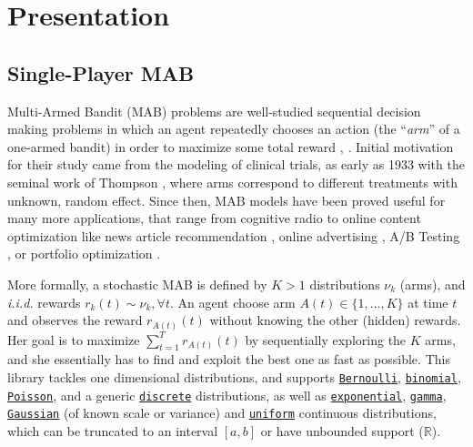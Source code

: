 \documentclass[a4paper,10pt,]{article}
\begin{document}

\section{Presentation}\label{presentation}

\subsection{Single-Player MAB}\label{single-player-mab}

Multi-Armed Bandit (MAB) problems are well-studied sequential decision
making problems in which an agent repeatedly chooses an action (the
``\emph{arm}'' of a one-armed bandit) in order to maximize some total
reward \citep{Robbins52}, \citep{LaiRobbins85}. Initial motivation for
their study came from the modeling of clinical trials, as early as 1933
with the seminal work of Thompson \citep{Thompson33}, where arms
correspond to different treatments with unknown, random effect. Since
then, MAB models have been proved useful for many more applications,
that range from cognitive radio \citep{Jouini09} to online content
optimization like news article recommendation \citep{Li10}, online
advertising \citep{LiChapelle11}, A/B Testing \citep{Kaufmann14,Jamieson17ABTest}, or portfolio optimization \citep{Sani12}.


More formally, a stochastic MAB is defined by $K>1$ distributions $\nu_k$ (arms),
and \emph{i.i.d.} rewards $r_k(t) \sim \nu_k, \forall t$.
An agent choose arm $A(t)\in\{1,\dots,K\}$ at time $t$ and
observes the reward $r_{A(t)}(t)$ without knowing the other (hidden) rewards.
Her goal is to maximize $\sum_{t=1}^T r_{A(t)}(t)$ by sequentially exploring the $K$ arms,
and she essentially has to find and exploit the best one as fast as possible.
This library tackles one dimensional distributions,
and supports \href{https://SMPyBandits.GitHub.io/docs/Arms.Bernoulli.html}{\texttt{Bernoulli}}, \href{https://SMPyBandits.GitHub.io/docs/Arms.Binomial.html}{\texttt{binomial}}, \href{https://SMPyBandits.GitHub.io/docs/Arms.Poisson.html}{\texttt{Poisson}}, and a generic \href{https://SMPyBandits.GitHub.io/docs/Arms.DiscreteArm.html}{\texttt{discrete}} distributions,
as well as \href{https://SMPyBandits.GitHub.io/docs/Arms.Exponential.html}{\texttt{exponential}}, \href{https://SMPyBandits.GitHub.io/docs/Arms.Gamma.html}{\texttt{gamma}}, \href{https://SMPyBandits.GitHub.io/docs/Arms.Gaussian.html}{\texttt{Gaussian}} (of known scale or variance) and \href{https://SMPyBandits.GitHub.io/docs/Arms.Uniform.html}{\texttt{uniform}} continuous distributions,
which can be truncated to an interval $[a,b]$ or have unbounded support ($\mathbb{R}$).
\end{document}
